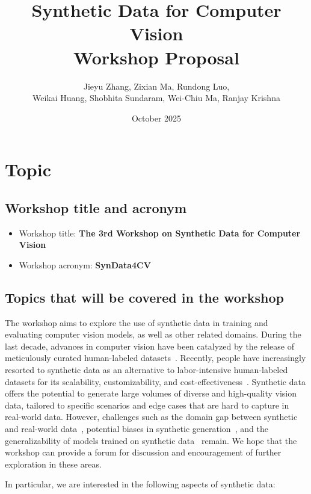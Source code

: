 \documentclass{article}
\title{Synthetic Data for Computer Vision\\Workshop Proposal}
\author{Jieyu Zhang, Zixian Ma, Rundong Luo, \\Weikai Huang, Shobhita Sundaram, Wei-Chiu Ma, Ranjay Krishna}
\date{October 2025}
\begin{document}
\maketitle

\section{Topic}
\subsection{Workshop title and acronym}
\begin{itemize}
    \item Workshop title: \textbf{The 3rd Workshop on Synthetic Data for Computer Vision}
    \item Workshop acronym: \textbf{SynData4CV}
\end{itemize}

    \subsection{Topics that will be covered in the workshop}

The workshop aims to explore the use of synthetic data in training and evaluating computer vision models, as well as other related domains. During the last decade, advances in computer vision have been catalyzed by the release of meticulously curated human-labeled datasets~\cite{5206848,lin2014microsoft,krishna2017visual}. Recently, people have increasingly resorted to synthetic data as an alternative to labor-intensive human-labeled datasets for its scalability, customizability, and cost-effectiveness~\cite{li2023benchmarking,Shipard2023DiversityID,Sariyildiz2022FakeIT,nguyen2023improving,yang2023alip,li2023stablellava}. Synthetic data offers the potential to generate large volumes of diverse and high-quality vision data, tailored to specific scenarios and edge cases that are hard to capture in real-world data. However, challenges such as the domain gap between synthetic and real-world data~\cite{tobin2017domain,tremblay2018training}, potential biases in synthetic generation~\cite{yu2023large}, and the generalizability of models trained on synthetic data~\cite{mikami2021scaling,he2022synthetic} remain. We hope that the workshop can provide a forum for discussion and encouragement of further exploration in these areas.

In particular, we are interested in the following aspects of synthetic data:
\end{document}
